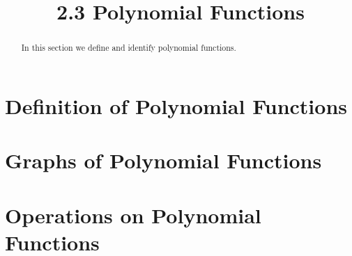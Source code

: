 \documentclass[handout]{ximera}
\title{2.3 Polynomial Functions}
\begin{document}
\begin{abstract}
In this section we define and identify polynomial functions.
\end{abstract}

\maketitle


\section{Definition of Polynomial Functions}




\section{Graphs of Polynomial Functions}


\section{Operations on Polynomial Functions}
\end{document}
